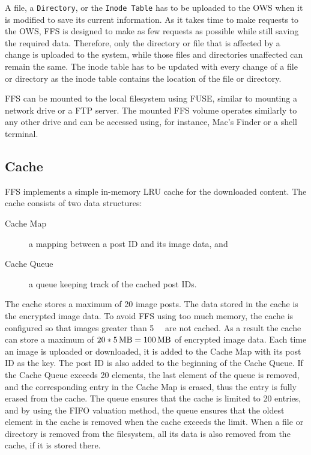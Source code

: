 A file, a \texttt{Directory}, or the \texttt{Inode Table} has to be uploaded to the \gls{OWS} when it is modified to save its current information. As it takes time to make requests to the \gls{OWS}, \gls{FFS} is designed to make as few requests as possible while still saving the required data. Therefore, only the directory or file that is affected by a change is uploaded to the system, while those files and directories unaffected can remain the same. The inode table has to be updated with every change of a file or directory as the inode table contains the location of the file or directory.

\gls{FFS} can be mounted to the local filesystem using \gls{FUSE}, similar to mounting a network drive or a \gls{FTP} server. The mounted \gls{FFS} volume operates similarly to any other drive and can be accessed using, for instance, Mac's Finder or a shell terminal.

\subsection{Cache}
\label{subsec:ffs_impl_cache}
\gls{FFS} implements a simple \mbox{in-memory} \gls{LRU} cache for the downloaded content. The cache consists of two data structures: 
\begin{description}
	\item[Cache Map] a mapping between a post ID and its image data, and
	\item[Cache Queue] a queue keeping track of the cached post IDs.
\end{description}
The cache stores a maximum of 20 image posts. The data stored in the cache is the encrypted image data. To avoid \gls{FFS} using too much memory, the cache is configured so that images greater than \SI{5}{\mega\byte} are not cached. As a result the cache can store a maximum of $20 * \text{\SI[per-mode = symbol]{5}{\mega\byte}} = \text{\SI[per-mode = symbol]{100}{\mega\byte}}$ of encrypted image data. Each time an image is uploaded or downloaded, it is added to the Cache Map with its post ID as the key. The post ID is also added to the beginning of the Cache Queue. If the Cache Queue exceeds 20 elements, the last element of the queue is removed, and the corresponding entry in the Cache Map is erased, thus the entry is fully erased from the cache. The queue ensures that the cache is limited to 20 entries, and by using the \gls{FIFO} valuation method, the queue ensures that the oldest element in the cache is removed when the cache exceeds the limit. When a file or directory is removed from the filesystem, all its data is also removed from the cache, if it is stored there.

